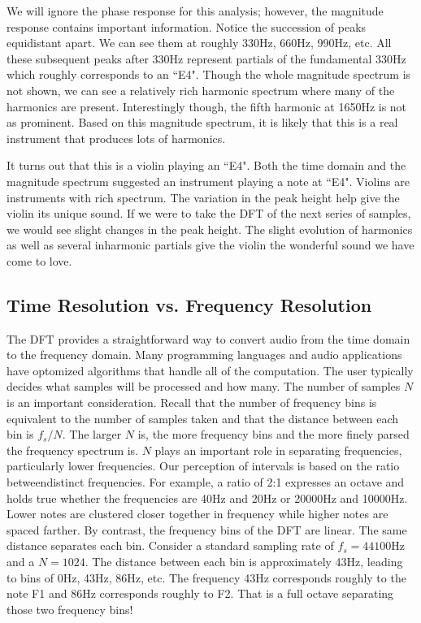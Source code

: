 We will ignore the phase response for this analysis; however, the magnitude response contains important
information.  Notice the succession of peaks equidistant apart.  We can see them at roughly 330Hz, 660Hz,
990Hz, etc.  All these subsequent peaks after 330Hz represent partials of the fundamental 330Hz which
roughly corresponds to an ``E4".  Though the whole magnitude spectrum is not shown, we can see a
relatively rich harmonic spectrum where many of the harmonics are present.  Interestingly though, the
fifth harmonic at 1650Hz is not as prominent.  Based on this magnitude spectrum, it is likely that this
is a real instrument that produces lots of harmonics.  

It turns out that this is a violin playing an ``E4".  Both the time domain and the magnitude spectrum suggested
an instrument playing a note at ``E4".  Violins are instruments with rich spectrum.  The variation in the peak
height help give the violin its unique sound.  If we were to take the DFT of the next series of samples, we would
see slight changes in the peak height.  The slight evolution of harmonics as well as several inharmonic partials
give the violin the wonderful sound we have come to love.

\subsection*{Time Resolution vs. Frequency Resolution}

The DFT provides a straightforward way to convert audio from the time domain to the frequency domain.  Many
programming languages and audio applications have optomized algorithms that handle all of the computation.
The user typically decides what samples will be processed and how many.  The number of samples $N$ is an important
consideration.  Recall that the number of frequency bins is equivalent to the number of samples taken and that the
distance between each bin is $f_s/N$.  The larger $N$ is, the more frequency bins and the more finely parsed the frequency spectrum is.  $N$ plays an important role in separating frequencies, particularly lower frequencies.  Our perception of intervals is based on the ratio betweendistinct frequencies.  For example, a ratio of 2:1 expresses an
octave and holds true whether the frequencies are 40Hz and 20Hz or 20000Hz and 10000Hz.  Lower notes are 
clustered closer together in frequency while higher notes are spaced farther.  By contrast, the 
frequency bins of the DFT are linear.  The same distance separates each bin.  Consider a standard sampling 
rate of $f_s = 44100$Hz and a $N = 1024$.  The distance between each bin is approximately 43Hz, leading to 
bins of 0Hz, 43Hz, 86Hz, etc.  The frequency 43Hz corresponds roughly to the note F1 and 86Hz corresponds
roughly to F2.  That is a full octave separating those two frequency bins!  


